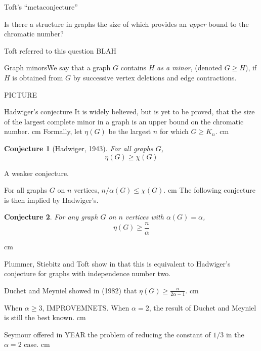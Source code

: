 \documentclass{beamer}
\newtheorem{conjecture}{Conjecture}
\newcommand{\bframe}[2]{\begin{frame}{#1}#2\end{frame}}
\begin{document}
\bframe{Toft's ``metaconjecture''}{

Is there a structure in graphs the size of which provides an {\it upper } bound to the chromatic number?\pause

Toft referred to this question BLAH
}

\bframe{Graph minors}{We say that a graph $G$ contains $H$ \textit{as a minor}, (denoted $G\geq H$), if $H$ is obtained from $G$ by successive vertex deletions and edge contractions.\pause

PICTURE
	 }

\bframe{Hadwiger's conjecture}{
    It is widely believed, but is yet to be proved, that the size of the largest complete minor in a graph is an upper bound on the chromatic number. \pause
\vskip 0.5 cm Formally, let $\eta(G)$ be the largest $n$ for which $G \geq K_n$.\pause
 \vskip 0.5 cm \begin{conjecture}[Hadwiger, 1943] For all graphs $G$, \[\eta(G) \geq \chi(G)\] 
\end{conjecture}
 }


\bframe{A weaker conjecture.}{

	For all graphs $G$ on $n$ vertices, $n/\alpha(G) \leq \chi(G)$.\pause\vskip 0.5 cm
 The following conjecture is then implied by Hadwiger's.\pause
\begin{conjecture}\label{hc}
 For any graph $G$ on $n$ vertices with $\alpha(G) =\alpha$, \[\eta(G) \geq \frac{n}{\alpha}\]
\end{conjecture}
\pause \vskip 0.25 cm

Plummer, Stiebitz and Toft  show in \cite{MR2070161} that this is equivalent to Hadwiger's conjecture for graphs with independence number two.

}

\bframe{}{
 Duchet and Meyniel showed in  \cite{MR671905} (1982) that $\displaystyle\eta(G) \geq \frac{ n}{2\alpha - 1}$.\pause \vskip 0.5 cm 

When $\alpha \geq 3$, IMPROVEMNETS.   \pause  When $\alpha = 2$, the result of Duchet and Meyniel is still the best known. \pause \vskip 0.5 cm

Seymour offered in YEAR the problem of reducing the constant of $1/3$ in the $\alpha  = 2 $ case. \pause\vskip 0.5 cm

}
\end{document}
